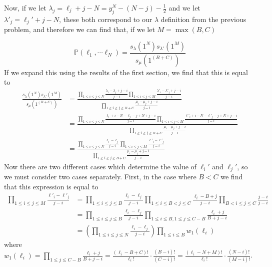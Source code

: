 \documentclass[12pt]{article}
\begin{document}
	Now, if we let $\lambda_j=\ell_j+j-N=y_j^N-(N-j)-\frac{1}{2}$ and we let $\lambda'_j=\ell_j'+j-N$, these both correspond to our $\lambda$ definition from the previous problem, and therefore we can find that, if we let $M=\max{(B,C)}$
	
	\[
	\mathbb{P}(\ell_1,\cdots \ell_N)=\frac{s_\lambda(1^N)s_{\lambda'}(1^M)}{s_\mu(1^{(B+C)})}
	\]
	If we expand this using the results of the first section, we find that this is equal to 
	\begin{align*}
\frac{s_\lambda(1^N)s_{\lambda'}(1^M)}{s_\mu(1^{(B+C)})}&=\frac{\prod_{1\leq i \leq j \leq N}\frac{\lambda_i-\lambda_j+j-i}{j-i}\prod_{1\leq i\leq j\leq M}\frac{\lambda'_i-\lambda'_j+j-i}{j-i}}{\prod_{1\leq i\leq j\leq B+C}\frac{\mu_i-\mu_j+j-i}{j-i}}\\
&=\frac{\prod_{1\leq i \leq j \leq N}\frac{\ell_i+i-N-\ell_j-j+N+j-i}{j-i}\prod_{1\leq i\leq j\leq M}\frac{\ell'_i+i-N-\ell'_j-j+N+j-i}{j-i}}{\prod_{1\leq i\leq j\leq B+C}\frac{\mu_i-\mu_j+j-i}{j-i}}\\
&=\frac{\prod_{1\leq i \leq j \leq N}\frac{\ell_i-\ell_j}{j-i}\prod_{1\leq i \leq j \leq M}\frac{\ell'_i-\ell'_j}{j-i}}{\prod_{1\leq i\leq j \leq B+C}\frac{\mu_i-\mu_j+j-i}{j-i}}
	\end{align*}
	Now there are two different cases which determine the value of $\ell_i'$ and $\ell_j'$, so we must consider two cases separately. 
	First, in the case where $B<C$ we find that this expression is equal to
	 \begin{align*}
	\prod_{1\leq i \leq j \leq M}\frac{\ell'_i-\ell'_j}{j-i}
	&=\prod_{1\leq i \leq j\leq  B}\frac{\ell_i-\ell_j}{j-i}
	\prod_{1\leq i \leq B < j \leq C}\frac{\ell_i-B+j}{j-i}
	\prod_{B< i\leq j \leq C}\frac{j-i}{j-i}\\
	&=\prod_{1\leq i \leq j \leq B}\frac{\ell_i-\ell_j}{j-i}\prod_{1\leq i\leq B,1\leq j \leq C-B}\frac{\ell_i+j}{B+j-i}\\
	&=\left(\prod_{1\leq i \leq j \leq N}\frac{\ell_i-\ell_j}{j-i}\right)\prod_{1\leq i \leq B}w_1(\ell_i)
	\end{align*}
	where $w_1(\ell_i)=\prod_{1\leq j\leq C-B}\frac{\ell_i+j}{B+j-i}=\frac{(\ell_i-B+C)!}{\ell_i!}\cdot \frac{(B-i)!}{(C-i)!}=\frac{(\ell_i-N+M)!}{\ell_i!}\cdot \frac{(N-i)!}{(M-i)!}$.
	
\end{document}
